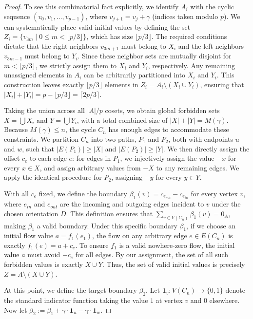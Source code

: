 \documentclass[a4paper,12pt]{article}
\theoremstyle{plain}
\theoremstyle{definition}
\renewcommand\le\leqslant
\renewcommand\ge\geqslant
\begin{document}
\begin{proof}
To see this combinatorial fact explicitly, we identify $A_i$ with the cyclic sequence $(v_0, v_1, \dots, v_{p-1})$, where $v_{j+1} = v_j + \gamma$ (indices taken modulo $p$). We can systematically place valid initial values by defining the set $Z_i = \{v_{3m} \mid 0 \le m < \lfloor p/3 \rfloor\}$, which has size $\lfloor p/3 \rfloor$. The required conditions dictate that the right neighbors $v_{3m+1}$ must belong to $X_i$ and the left neighbors $v_{3m-1}$ must belong to $Y_i$. Since these neighbor sets are mutually disjoint for $m < \lfloor p/3 \rfloor$, we strictly assign them to $X_i$ and $Y_i$, respectively. Any remaining unassigned elements in $A_i$ can be arbitrarily partitioned into $X_i$ and $Y_i$. This construction leaves exactly $\lfloor p/3 \rfloor$ elements in $Z_i = A_i \setminus (X_i \cup Y_i)$, ensuring that $|X_i| + |Y_i| = p - \lfloor p/3 \rfloor = \lceil 2p/3 \rceil$.

Taking the union across all $|A|/p$ cosets, we obtain global forbidden sets $X = \bigcup X_i$ and $Y = \bigcup Y_i$, with a total combined size of $|X| + |Y| = M(\gamma)$.
%
Because $M(\gamma) \le n$, the cycle $C_n$ has enough edges to accommodate these constraints. We partition $C_n$ into two paths, $P_1$ and $P_2$, both with endpoints $u$ and $w$, such that $|E(P_1)| \ge |X|$ and $|E(P_2)| \ge |Y|$. We then directly assign the offset $c_e$ to each edge $e$: for edges in $P_1$, we injectively assign the value $-x$ for every $x \in X$, and assign arbitrary values from $-X$ to any remaining edges. We apply the identical procedure for $P_2$, assigning $-y$ for every $y \in Y$. 

With all $c_e$ fixed, we define the boundary $\beta_1(v) = c_{e_{out}} - c_{e_{in}}$ for every vertex $v$, where $e_{in}$ and $e_{out}$ are the incoming and outgoing edges incident to $v$ under the chosen orientation $D$. This definition ensures that $\sum_{v \in V(C_n)} \beta_1(v) = 0_A$, making $\beta_1$ a valid boundary. 
Under this specific boundary $\beta_1$, if we choose an initial flow value $a = f_1(e_1)$, the flow on any arbitrary edge $e \in E(C_n)$ is exactly $f_1(e) = a + c_e$. To ensure $f_1$ is a valid nowhere-zero flow, the initial value $a$ must avoid $-c_e$ for all edges. By our assignment, the set of all such forbidden values is exactly $X \cup Y$. Thus, the set of valid initial values is precisely $Z = A \setminus (X \cup Y)$.

At this point, we define the target boundary $\beta_2$. Let $\mathbf1_v: V(C_n) \to \{0, 1\}$ denote the standard indicator function taking the value $1$ at vertex $v$ and $0$ elsewhere. Now let $\beta_2:= \beta_1 + \gamma \cdot \mathbf1_{u} - \gamma \cdot \mathbf1_{w}$. 


\end{proof}
\end{document}
